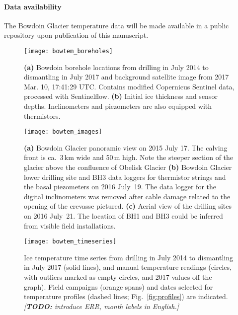 \documentclass[utf8]{article}
\newcommand{\todo}[1]{\textcolor{c3}{\emph{[\textbf{TODO:} #1]}}}
\begin{document}
\paragraph{Data availability}

    The Bowdoin Glacier temperature data will be made available in a public
    repository upon publication of this manuscript.







\clearpage

    \begin{figure}
      \centerline{\texttt{[image: bowtem\_boreholes]}}
      \caption{%
        \textbf{(a)} Bowdoin borehole locations from drilling in July 2014 to
          dismantling in July 2017 and background satellite image from 2017
          Mar. 10, 17:41:29 UTC. Contains modified Copernicus Sentinel data,
          processed with Sentinelflow.
        \textbf{(b)} Initial ice thickness and sensor depths. Inclinometers
          and piezometers are also equipped with thermistors.}
      \label{fig:boreholes}
    \end{figure}

    \begin{figure}
      \centerline{\texttt{[image: bowtem\_images]}}
      \caption{%
        \textbf{(a)} Bowdoin Glacier panoramic view on 2015 July 17. The
          calving front is ca.~3\,km wide and 50\,m high. Note the steeper
          section of the glacier above the confluence of Obelisk Glacier
        \textbf{(b)} Bowdoin Glacier lower drilling site and BH3 data loggers
          for thermistor strings and the basal piezometers on 2016 July~19. The
          data logger for the digital inclinometers was removed after cable
          damage related to the opening of the crevasse pictured.
        \textbf{(c)} Aerial view of the drilling sites on 2016 July~21. The
          location of BH1 and BH3 could be inferred from visible field
          installations.}
      \label{fig:images}
    \end{figure}

    \begin{figure}
      \centerline{\texttt{[image: bowtem\_timeseries]}}
      \caption{%
        Ice temperature time series from drilling in July 2014 to dismantling
        in July 2017 (solid lines), and manual temperature readings (circles,
        with outliers marked as empty circles, and 2017 values off the graph).
        Field campaigns (orange spans) and dates selected for
        temperature profiles (dashed lines; Fig.~\ref{fig:profiles}) are
        indicated.
        \todo{introduce ERR, month labels in English.}}
      \label{fig:timeseries}
    \end{figure}
\end{document}
